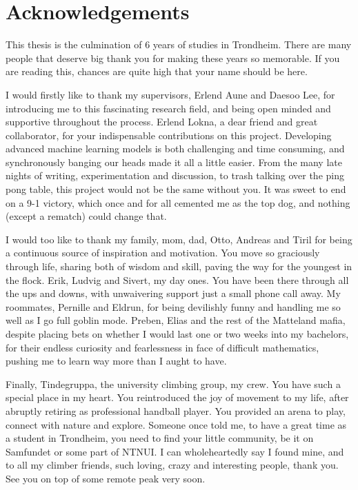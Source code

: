 \documentclass[../../thesis.tex]{subfiles}
\begin{document}
\section{Acknowledgements}
This thesis is the culmination of 6 years of studies in Trondheim. There are many people that deserve big thank you for making these years so memorable. If you are reading this, chances are quite high that your name should be here.\newline 

I would firstly like to thank my supervisors, Erlend Aune and Daesoo Lee, for introducing me to this fascinating research field, and being open minded and supportive throughout the process. Erlend Lokna, a dear friend and great collaborator, for your indispensable contributions on this project. Developing advanced machine learning models is both challenging and time consuming, and synchronously banging our heads made it all a little easier. From the many late nights of writing, experimentation and discussion, to trash talking over the ping pong table, this project would not be the same without you. It was sweet to end on a 9-1 victory, which once and for all cemented me as the top dog, and nothing (except a rematch) could change that.\newline

I would too like to thank my family, mom, dad, Otto, Andreas and Tiril for being a continuous source of inspiration and motivation. You move so graciously through life, sharing both of wisdom and skill, paving the way for the youngest in the flock. Erik, Ludvig and Sivert, my day ones. You have been there through all the ups and downs, with unwaivering support just a small phone call away. My roommates, Pernille and Eldrun, for being devilishly funny and handling me so well as I go full goblin mode. Preben, Elias and the rest of the Matteland mafia, despite placing bets on whether I would last one or two weeks into my bachelors, for their endless curiosity and fearlessness in face of difficult mathematics, pushing me to learn way more than I aught to have. \newline

Finally, Tindegruppa, the university climbing group, my crew. You have such a special place in my heart. You reintroduced the joy of movement to my life, after abruptly retiring as professional handball player. You provided an arena to play, connect with nature and explore. Someone once told me, to have a great time as a student in Trondheim, you need to find your little community, be it on Samfundet or some part of NTNUI. I can wholeheartedly say I found mine, and to all my climber friends, such loving, crazy and interesting people, thank you. See you on top of some remote peak very soon.
\end{document}
